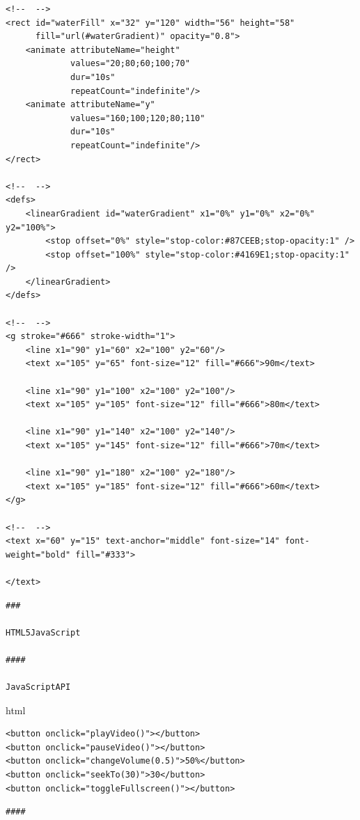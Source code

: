 \begin{verbatim}
<!--  -->
<rect id="waterFill" x="32" y="120" width="56" height="58" 
      fill="url(#waterGradient)" opacity="0.8">
    <animate attributeName="height" 
             values="20;80;60;100;70" 
             dur="10s" 
             repeatCount="indefinite"/>
    <animate attributeName="y" 
             values="160;100;120;80;110" 
             dur="10s" 
             repeatCount="indefinite"/>
</rect>

<!--  -->
<defs>
    <linearGradient id="waterGradient" x1="0%" y1="0%" x2="0%" y2="100%">
        <stop offset="0%" style="stop-color:#87CEEB;stop-opacity:1" />
        <stop offset="100%" style="stop-color:#4169E1;stop-opacity:1" />
    </linearGradient>
</defs>

<!--  -->
<g stroke="#666" stroke-width="1">
    <line x1="90" y1="60" x2="100" y2="60"/>
    <text x="105" y="65" font-size="12" fill="#666">90m</text>
    
    <line x1="90" y1="100" x2="100" y2="100"/>
    <text x="105" y="105" font-size="12" fill="#666">80m</text>
    
    <line x1="90" y1="140" x2="100" y2="140"/>
    <text x="105" y="145" font-size="12" fill="#666">70m</text>
    
    <line x1="90" y1="180" x2="100" y2="180"/>
    <text x="105" y="185" font-size="12" fill="#666">60m</text>
</g>

<!--  -->
<text x="60" y="15" text-anchor="middle" font-size="14" font-weight="bold" fill="#333">
    
</text>
\end{verbatim}

\begin{lstlisting}
### 

HTML5JavaScript

#### 

JavaScriptAPI

\end{lstlisting}

html

\begin{verbatim}
<button onclick="playVideo()"></button>
<button onclick="pauseVideo()"></button>
<button onclick="changeVolume(0.5)">50%</button>
<button onclick="seekTo(30)">30</button>
<button onclick="toggleFullscreen()"></button>
\end{verbatim}

\begin{lstlisting}
#### 

\end{lstlisting}

